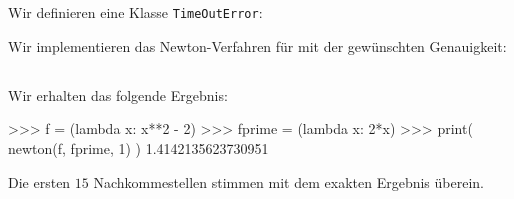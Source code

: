 \section{}





\subsection{}

Wir definieren eine Klasse \texttt{TimeOutError}:



Wir implementieren das Newton-Verfahren für mit der gewünschten Genauigkeit:







\subsection{}

Wir erhalten das folgende Ergebnis:

\begin{consoleoutput}
>>> f = (lambda x: x**2 - 2)
>>> fprime = (lambda x: 2*x)
>>> print( newton(f, fprime, 1) )
1.4142135623730951
\end{consoleoutput}
Die ersten $15$ Nachkommestellen stimmen mit dem exakten Ergebnis überein.
